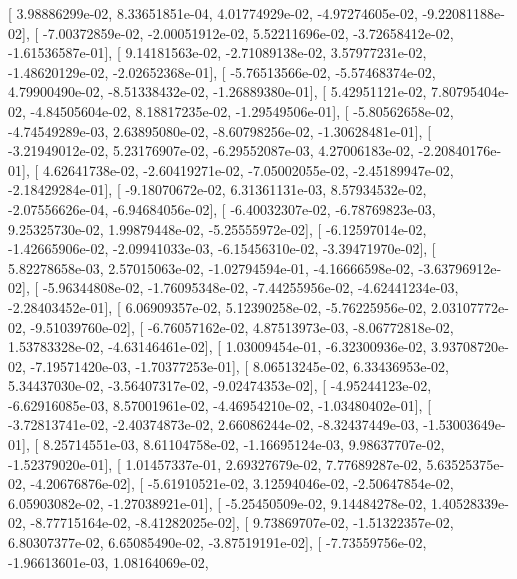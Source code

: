 \documentclass{article}
\begin{document}
       [  3.98886299e-02,   8.33651851e-04,   4.01774929e-02,
         -4.97274605e-02,  -9.22081188e-02],
       [ -7.00372859e-02,  -2.00051912e-02,   5.52211696e-02,
         -3.72658412e-02,  -1.61536587e-01],
       [  9.14181563e-02,  -2.71089138e-02,   3.57977231e-02,
         -1.48620129e-02,  -2.02652368e-01],
       [ -5.76513566e-02,  -5.57468374e-02,   4.79900490e-02,
         -8.51338432e-02,  -1.26889380e-01],
       [  5.42951121e-02,   7.80795404e-02,  -4.84505604e-02,
          8.18817235e-02,  -1.29549506e-01],
       [ -5.80562658e-02,  -4.74549289e-03,   2.63895080e-02,
         -8.60798256e-02,  -1.30628481e-01],
       [ -3.21949012e-02,   5.23176907e-02,  -6.29552087e-03,
          4.27006183e-02,  -2.20840176e-01],
       [  4.62641738e-02,  -2.60419271e-02,  -7.05002055e-02,
         -2.45189947e-02,  -2.18429284e-01],
       [ -9.18070672e-02,   6.31361131e-03,   8.57934532e-02,
         -2.07556626e-04,  -6.94684056e-02],
       [ -6.40032307e-02,  -6.78769823e-03,   9.25325730e-02,
          1.99879448e-02,  -5.25555972e-02],
       [ -6.12597014e-02,  -1.42665906e-02,  -2.09941033e-03,
         -6.15456310e-02,  -3.39471970e-02],
       [  5.82278658e-03,   2.57015063e-02,  -1.02794594e-01,
         -4.16666598e-02,  -3.63796912e-02],
       [ -5.96344808e-02,  -1.76095348e-02,  -7.44255956e-02,
         -4.62441234e-03,  -2.28403452e-01],
       [  6.06909357e-02,   5.12390258e-02,  -5.76225956e-02,
          2.03107772e-02,  -9.51039760e-02],
       [ -6.76057162e-02,   4.87513973e-03,  -8.06772818e-02,
          1.53783328e-02,  -4.63146461e-02],
       [  1.03009454e-01,  -6.32300936e-02,   3.93708720e-02,
         -7.19571420e-03,  -1.70377253e-01],
       [  8.06513245e-02,   6.33436953e-02,   5.34437030e-02,
         -3.56407317e-02,  -9.02474353e-02],
       [ -4.95244123e-02,  -6.62916085e-03,   8.57001961e-02,
         -4.46954210e-02,  -1.03480402e-01],
       [ -3.72813741e-02,  -2.40374873e-02,   2.66086244e-02,
         -8.32437449e-03,  -1.53003649e-01],
       [  8.25714551e-03,   8.61104758e-02,  -1.16695124e-03,
          9.98637707e-02,  -1.52379020e-01],
       [  1.01457337e-01,   2.69327679e-02,   7.77689287e-02,
          5.63525375e-02,  -4.20676876e-02],
       [ -5.61910521e-02,   3.12594046e-02,  -2.50647854e-02,
          6.05903082e-02,  -1.27038921e-01],
       [ -5.25450509e-02,   9.14484278e-02,   1.40528339e-02,
         -8.77715164e-02,  -8.41282025e-02],
       [  9.73869707e-02,  -1.51322357e-02,   6.80307377e-02,
          6.65085490e-02,  -3.87519191e-02],
       [ -7.73559756e-02,  -1.96613601e-03,   1.08164069e-02,
\end{document}
